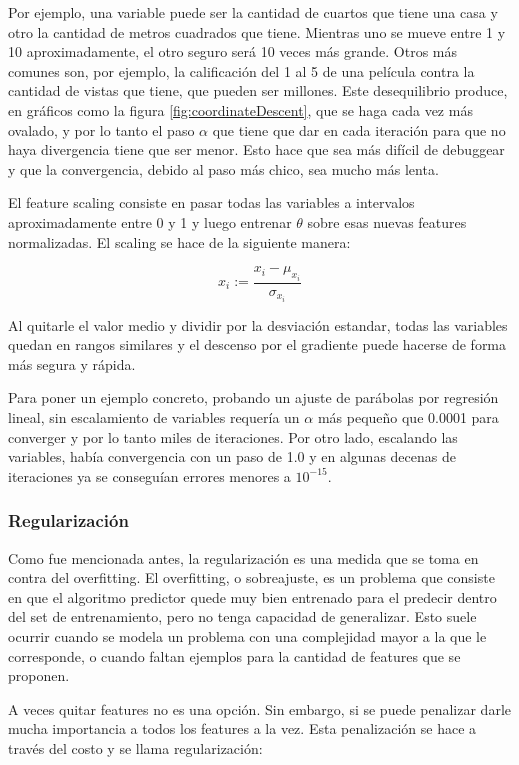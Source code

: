 Por ejemplo, una variable puede ser la cantidad de cuartos que tiene una casa y otro la cantidad de metros cuadrados que tiene. Mientras uno se mueve entre 1 y 10 aproximadamente, el otro seguro será 10 veces más grande. Otros más comunes son, por ejemplo, la calificación del 1 al 5 de una película contra la cantidad de vistas que tiene, que pueden ser millones. Este desequilibrio produce, en gráficos como la figura \ref{fig:coordinateDescent}, que se haga cada vez más ovalado, y por lo tanto el paso $\alpha$ que tiene que dar en cada iteración para que no haya divergencia tiene que ser menor. Esto hace que sea más difícil de debuggear y que la convergencia, debido al paso más chico, sea mucho más lenta.

El feature scaling consiste en pasar todas las variables a intervalos aproximadamente entre 0 y 1 y luego entrenar $\theta$ sobre esas nuevas features normalizadas. El scaling se hace de la siguiente manera:

\begin{equation}
x_i := \frac{x_i - \mu_{x_i}}{\sigma_{x_i}}
\end{equation}

Al quitarle el valor medio y dividir por la desviación estandar, todas las variables quedan en rangos similares y el descenso por el gradiente puede hacerse de forma más segura y rápida.

Para poner un ejemplo concreto, probando un ajuste de parábolas por regresión lineal, sin escalamiento de variables requería un $\alpha$ más pequeño que 0.0001 para converger y por lo tanto miles de iteraciones. Por otro lado, escalando las variables, había convergencia con un paso de 1.0 y en algunas decenas de iteraciones ya se conseguían errores menores a $10^{-15}$.

\subsubsection{Regularización}
Como fue mencionada antes, la regularización es una medida que se toma en contra del overfitting. El overfitting, o sobreajuste, es un problema que consiste en que el algoritmo predictor quede muy bien entrenado para el predecir dentro del set de entrenamiento, pero no tenga capacidad de generalizar. Esto suele ocurrir cuando se modela un problema con una complejidad mayor a la que le corresponde, o cuando faltan ejemplos para la cantidad de features que se proponen.

A veces quitar features no es una opción. Sin embargo, si se puede penalizar darle mucha importancia a todos los features a la vez. Esta penalización se hace a través del costo y se llama regularización:

